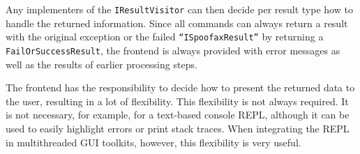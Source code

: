 Any implementers of the \texttt{IResultVisitor} can then decide per result type
how to handle the returned information. Since all commands can always return a
result with the original exception or the failed \texttt{``ISpoofaxResult''} by
returning a \texttt{FailOrSuccessResult}, the frontend is always provided with
error messages as well as the results of earlier processing steps.

The frontend has the responsibility to decide how to present the returned data
to the user, resulting in a lot of flexibility. This flexibility is not always
required. It is not necessary, for example, for a text-based console REPL,
although it can be used to easily highlight errors or print stack traces. When
integrating the REPL in multithreaded GUI toolkits, however, this flexibility is
very useful.

